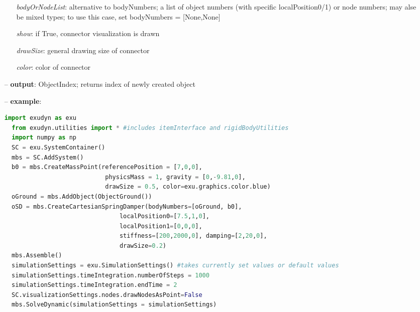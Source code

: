 \begin{itemize}[leftmargin=0.7cm]
\begin{itemize}[leftmargin=1.2cm]
\item[]{\it bodyOrNodeList}: alternative to bodyNumbers; a list of object numbers (with specific localPosition0/1) or node numbers; may alse be mixed types; to use this case, set bodyNumbers = [None,None]
\item[]{\it show}: if True, connector visualization is drawn
\item[]{\it drawSize}: general drawing size of connector
\item[]{\it color}: color of connector
\end{itemize}
\item[--]
{\bf output}: ObjectIndex; returns index of newly created object
\item[--]
{\bf example}: \vspace{-12pt}\ei\begin{lstlisting}[language=Python, xleftmargin=36pt]
  import exudyn as exu
  from exudyn.utilities import * #includes itemInterface and rigidBodyUtilities
  import numpy as np
  SC = exu.SystemContainer()
  mbs = SC.AddSystem()
  b0 = mbs.CreateMassPoint(referencePosition = [7,0,0],
                            physicsMass = 1, gravity = [0,-9.81,0],
                            drawSize = 0.5, color=exu.graphics.color.blue)
  oGround = mbs.AddObject(ObjectGround())
  oSD = mbs.CreateCartesianSpringDamper(bodyNumbers=[oGround, b0],
                                localPosition0=[7.5,1,0],
                                localPosition1=[0,0,0],
                                stiffness=[200,2000,0], damping=[2,20,0],
                                drawSize=0.2)
  mbs.Assemble()
  simulationSettings = exu.SimulationSettings() #takes currently set values or default values
  simulationSettings.timeIntegration.numberOfSteps = 1000
  simulationSettings.timeIntegration.endTime = 2
  SC.visualizationSettings.nodes.drawNodesAsPoint=False
  mbs.SolveDynamic(simulationSettings = simulationSettings)
\end{lstlisting}\vspace{-24pt}\bi\item[]\vspace{-24pt}\vspace{12pt}\end{itemize}
%

